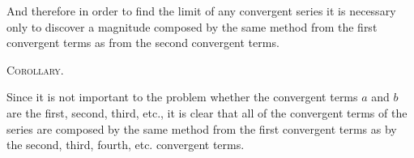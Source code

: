 \documentclass[11pt,letterpaper]{book}
\begin{document}
And therefore in order to find the limit of any convergent series it is
necessary only to discover a magnitude composed by the same method from the
first convergent terms as from the second convergent terms.

\begin{samepage}
\begin{center}
\large\textsc{Corollary.}
\end{center}

Since it is not important to the problem whether the convergent terms $a$ and
$b$ are the first, second, third, etc., it is clear that all of the convergent
terms of the series are composed by the same method from the first convergent
terms as by the second, third, fourth, etc. convergent terms.
\end{samepage}

\end{document}

